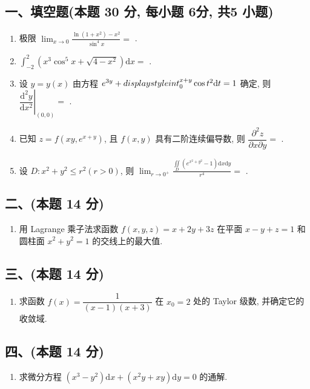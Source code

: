 \subsection*{一、填空题(本题 30 分,  每小题 6分,  共5 小题)}
\begin{enumerate}
    \item 极限 $\displaystyle\lim_{x \to 0} \frac{\ln(1 + x^2) - x^2}{\sin^4 x} =$\underline{\quad\quad} .
    \item $\displaystyle\int_{-2}^{2} (x^3 \cos^5 x + \sqrt{4 - x^2}) \mathrm{d}x =$\underline{\quad\quad} .
    \item 设 $y = y(x)$ 由方程 $e^{3y} + \\displaystyleint_{0}^{x+y} \cos t^2 \mathrm{d}t = 1$ 确定, 则 $\left. \dfrac{\mathrm{d}^2 y}{\mathrm{d}x^2} \right|_{(0,0)} =$\underline{\quad\quad} .
    \item 已知 $z = f(xy, e^{x+y})$, 且 $f(x, y)$ 具有二阶连续偏导数, 则 $\dfrac{\partial^2 z}{\partial x \partial y} =$ \underline{\quad\quad} .
    \item 设 $D: x^2 + y^2 \leqslant r^2 (r > 0)$, 则 $\displaystyle\lim_{r \to 0^+} \frac{\displaystyle\iint\limits_{D} (e^{x^2 + y^2} - 1) \mathrm{d}x \mathrm{d}y}{r^4} =$\underline{\quad\quad} .
\end{enumerate}

\subsection*{二、(本题 14 分)}
\begin{enumerate}[start=6]
    \item 用 Lagrange 乘子法求函数 $f(x, y, z) = x + 2y + 3z$ 在平面 $x - y + z = 1$ 和圆柱面 $x^2 + y^2 = 1$ 的交线上的最大值.
\end{enumerate}

\subsection*{三、(本题 14 分)}
\begin{enumerate}[start=7]
    \item 求函数 $f(x) = \dfrac{1}{(x - 1)(x + 3)}$ 在 $x_0 = 2$ 处的 Taylor 级数, 并确定它的收敛域.
\end{enumerate}

\subsection*{四、(本题 14 分)}
\begin{enumerate}[start=8]
    \item 求微分方程 $(x^3 - y^2) \mathrm{d}x + (x^2 y + xy) \mathrm{d}y = 0$ 的通解.
\end{enumerate}

